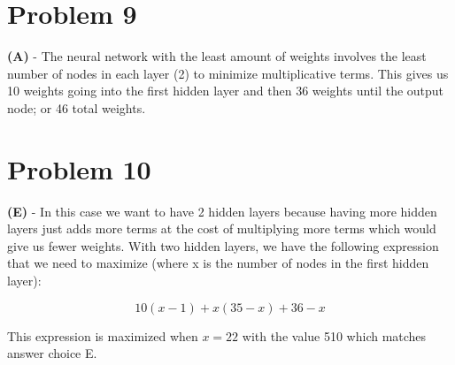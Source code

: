\documentclass[10pt,letter]{article}
\begin{document}
\section*{Problem 9}

\textbf{(A)} - The neural network with the least amount of weights involves the least number of nodes in each layer (2) to minimize multiplicative terms. This gives us 10 weights going into the first hidden layer and then 36 weights until the output node; or 46 total weights.

\section*{Problem 10}

\textbf{(E)} - In this case we want to have 2 hidden layers because having more hidden layers just adds more terms at the cost of multiplying more terms which would give us fewer weights. With two hidden layers, we have the following expression that we need to maximize (where x is the number of nodes in the first hidden layer):

\begin{equation}
10(x-1) + x(35-x) + 36-x
\end{equation}

This expression is maximized when $x = 22$ with the value 510 which matches answer choice E.
\end{document}
